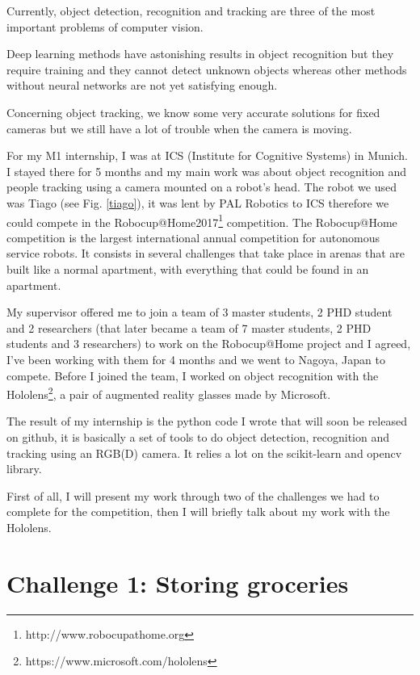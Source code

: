 \documentclass[a4paper, twocolumn]{article}
\begin{document}
    Currently, object detection, recognition and tracking are three of the most important problems of computer vision. 
    
    Deep learning methods have astonishing results in object recognition but they require training and they cannot detect unknown objects whereas other methods without neural networks are not yet satisfying enough. 
    
    Concerning object tracking, we know some very accurate solutions for fixed cameras but we still have a lot of trouble when the camera is moving.
    
    For my M1 internship, I was at ICS (Institute for Cognitive Systems) in Munich. I stayed there for 5 months and my main work was about object recognition and people tracking using a camera mounted on a robot's head. The robot we used was Tiago (see Fig. \ref{tiago}), it was lent by PAL Robotics to ICS therefore we could compete in the Robocup@Home2017\footnote{http://www.robocupathome.org} competition. The Robocup@Home competition is the largest international annual competition for autonomous service robots. It consists in several challenges that take place in arenas that are built like a normal apartment, with everything that could be found in an apartment.
    
    My supervisor offered me to join a team of 3 master students, 2 PHD student and 2 researchers (that later became a team of 7 master students, 2 PHD students and 3 researchers) to work on the Robocup@Home project and I agreed, I've been working with them for 4 months and we went to Nagoya, Japan to compete. Before I joined the team, I worked on object recognition with the Hololens\footnote{https://www.microsoft.com/hololens}, a pair of augmented reality glasses made by Microsoft.
    
    The result of my internship is the python code I wrote that will soon be released on github, it is basically a set of tools to do object detection, recognition and tracking using an RGB(D) camera. It relies a lot on the scikit-learn \cite{scikit-learn} and opencv \cite{itseez2015opencv} library.
    
    First of all, I will present my work through two of the challenges we had to complete for the competition, then I will briefly talk about my work with the Hololens.

    \section{Challenge 1: Storing groceries}
\end{document}
